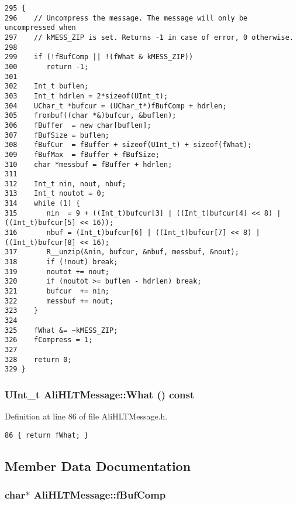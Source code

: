 \footnotesize\begin{verbatim}295 {
296    // Uncompress the message. The message will only be uncompressed when
297    // kMESS_ZIP is set. Returns -1 in case of error, 0 otherwise.
298 
299    if (!fBufComp || !(fWhat & kMESS_ZIP))
300       return -1;
301 
302    Int_t buflen;
303    Int_t hdrlen = 2*sizeof(UInt_t);
304    UChar_t *bufcur = (UChar_t*)fBufComp + hdrlen;
305    frombuf((char *&)bufcur, &buflen);
306    fBuffer  = new char[buflen];
307    fBufSize = buflen;
308    fBufCur  = fBuffer + sizeof(UInt_t) + sizeof(fWhat);
309    fBufMax  = fBuffer + fBufSize;
310    char *messbuf = fBuffer + hdrlen;
311 
312    Int_t nin, nout, nbuf;
313    Int_t noutot = 0;
314    while (1) {
315       nin  = 9 + ((Int_t)bufcur[3] | ((Int_t)bufcur[4] << 8) | ((Int_t)bufcur[5] << 16));
316       nbuf = (Int_t)bufcur[6] | ((Int_t)bufcur[7] << 8) | ((Int_t)bufcur[8] << 16);
317       R__unzip(&nin, bufcur, &nbuf, messbuf, &nout);
318       if (!nout) break;
319       noutot += nout;
320       if (noutot >= buflen - hdrlen) break;
321       bufcur  += nin;
322       messbuf += nout;
323    }
324 
325    fWhat &= ~kMESS_ZIP;
326    fCompress = 1;
327 
328    return 0;
329 }
\end{verbatim}\normalsize 


\subsubsection{\setlength{\rightskip}{0pt plus 5cm}UInt\_\-t Ali\-HLTMessage::What () const\hspace{0.3cm}{\tt  [inline]}}\label{classAliHLTMessage_a8}




Definition at line 86 of file Ali\-HLTMessage.h.

\footnotesize\begin{verbatim}86 { return fWhat; }
\end{verbatim}\normalsize 




\subsection{Member Data Documentation}
\subsubsection{\setlength{\rightskip}{0pt plus 5cm}char$\ast$ {\bf Ali\-HLTMessage::f\-Buf\-Comp}\hspace{0.3cm}{\tt  [private]}}\label{classAliHLTMessage_r3}




